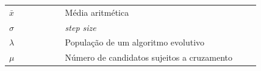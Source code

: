 

\begin{listasimb}

\begin{longtable}[l]{p{0.2\linewidth}p{0.7\linewidth}}
$\bar{x}$ & Média aritmética\\
$\sigma$ & \textit{step size}\\
$\lambda$ & População de um algoritmo evolutivo\\
$\mu$ & Número de candidatos sujeitos a cruzamento\\
\end{longtable}

\end{listasimb}

